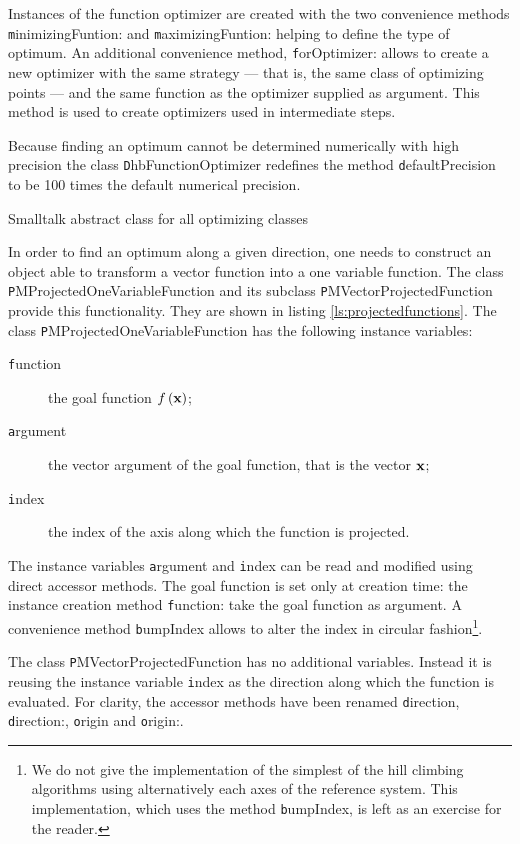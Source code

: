 Instances of the function optimizer are created with the two
convenience methods {\texttt minimizingFuntion:} and {\texttt
maximizingFuntion:} helping to define the type of optimum. An
additional convenience method, {\texttt forOptimizer:} allows to
create a new optimizer with the same strategy --- that is, the
same class of optimizing points --- and the same function as the
optimizer supplied as argument.
This method is used to create optimizers used in intermediate steps.

Because finding an optimum cannot be determined numerically with
high precision \cite{Press} the class {\texttt DhbFunctionOptimizer}
redefines the method {\texttt defaultPrecision} to be 100 times the
default numerical precision.
\begin{listing} Smalltalk abstract class for all optimizing classes \label{ls:optimizerAbstract}

\end{listing}

In order to find an optimum along a given direction, one needs to
construct an object able to transform a vector function into a one
variable function. The class {\texttt PMProjectedOneVariableFunction}
and its subclass {\texttt PMVectorProjectedFunction} provide this
functionality. They are shown in listing
\ref{ls:projectedfunctions}. The class {\texttt
PMProjectedOneVariableFunction} has the following instance
variables:
\begin{description}
  \item[\texttt function] the goal function $f\left({\textbf x}\right)$;
  \item[\texttt argument] the vector argument of the goal function,
  that is the vector ${\textbf x}$;
  \item[\texttt index] the index of the axis along which the function
  is projected.
\end{description}
The instance variables {\texttt argument} and {\texttt index} can be read
and modified using direct accessor methods.
The goal function is set only at creation time: the instance creation method {\texttt
function:} take the goal function as argument.
A convenience method {\texttt bumpIndex} allows to alter the index in circular
fashion\footnote{We do not give the implementation of the simplest
of the hill climbing algorithms using alternatively each axes of
the reference system. This implementation, which uses the method
{\texttt bumpIndex}, is left as an exercise for the reader.}.

The class {\texttt PMVectorProjectedFunction} has no additional
variables. Instead it is reusing the instance variable {\texttt index}
as the direction along which the function is evaluated. For
clarity, the accessor methods have been renamed {\texttt direction},
{\texttt direction:}, {\texttt origin} and {\texttt origin:}.

